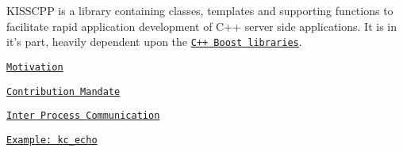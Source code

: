 K\-I\-S\-S\-C\-P\-P is a library containing classes, templates and supporting functions to facilitate rapid application development of C++ server side applications. It is in it's part, heavily dependent upon the \href{http://boost.org}{\tt C++ Boost libraries}.


\begin{DoxyItemize}
\item \href{md_motivation.html}{\tt Motivation}
\item \href{md_mandate.html}{\tt Contribution Mandate}
\item \href{md_inter_process_communication.html}{\tt Inter Process Communication}
\item \href{md_example_echo.html}{\tt Example\-: kc\-\_\-echo} 
\end{DoxyItemize}